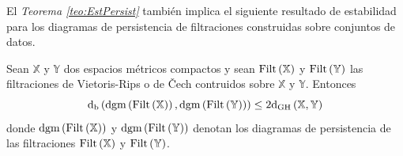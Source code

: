 El \emph{Teorema \ref{teo:EstPersist}} tambi\'en implica el siguiente resultado
de estabilidad para los diagramas de persistencia de filtraciones construidas sobre
conjuntos de datos.

\begin{teorema}
    Sean $\mathbb{X}$ y $\mathbb{Y}$ dos espacios m\'etricos compactos y sean
    $\mathrm{Filt}\left(\mathbb{X}\right)$ y $\mathrm{Filt}\left(\mathbb{Y}\right)$ las
    filtraciones de Vietoris-Rips o de \v Cech contruidos sobre $\mathbb{X}$ y
    $\mathbb{Y}$. Entonces
    \begin{equation*}
        \mathrm{d}_{\mathrm{b}}
        \left(\mathrm{dgm}\left(\mathrm{Filt}\left(\mathbb{X}\right)\right),
        \mathrm{dgm}\left(\mathrm{Filt}\left(\mathbb{Y}\right)\right)\right)\leq
        2\mathrm{d}_{\mathrm{GH}}\left(\mathbb{X},\mathbb{Y}\right)
    \end{equation*}
    donde $\mathrm{dgm}\left(\mathrm{Filt}\left(\mathbb{X}\right)\right)$ y
    $\mathrm{dgm}\left(\mathrm{Filt}\left(\mathbb{Y}\right)\right)$ denotan los
    diagramas de persistencia de las filtraciones $\mathrm{Filt}\left(\mathbb{X}\right)$ y
    $\mathrm{Filt}\left(\mathbb{Y}\right)$.
\end{teorema}